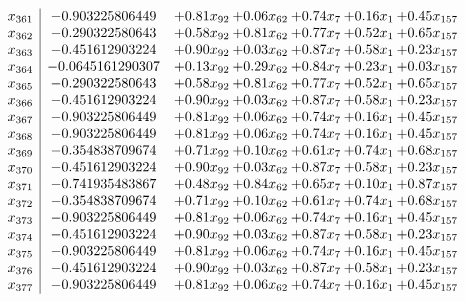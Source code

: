 \documentclass[8pt]{article}
\begin{document}
\[\begin{array}{c| c c@{\hskip 2pt} c@{\hskip 2pt} c@{\hskip 2pt} c@{\hskip 2pt} c@{\hskip 2pt} }
 x_{361}   &  -0.903225806449 & +  0.81 x_{92} & +  0.06 x_{62} & +  0.74 x_{7} & +  0.16 x_{1} & +  0.45 x_{157}\\
 x_{362}   &  -0.290322580643 & +  0.58 x_{92} & +  0.81 x_{62} & +  0.77 x_{7} & +  0.52 x_{1} & +  0.65 x_{157}\\
 x_{363}   &  -0.451612903224 & +  0.90 x_{92} & +  0.03 x_{62} & +  0.87 x_{7} & +  0.58 x_{1} & +  0.23 x_{157}\\
 x_{364}   &  -0.0645161290307 & +  0.13 x_{92} & +  0.29 x_{62} & +  0.84 x_{7} & +  0.23 x_{1} & +  0.03 x_{157}\\
 x_{365}   &  -0.290322580643 & +  0.58 x_{92} & +  0.81 x_{62} & +  0.77 x_{7} & +  0.52 x_{1} & +  0.65 x_{157}\\
 x_{366}   &  -0.451612903224 & +  0.90 x_{92} & +  0.03 x_{62} & +  0.87 x_{7} & +  0.58 x_{1} & +  0.23 x_{157}\\
 x_{367}   &  -0.903225806449 & +  0.81 x_{92} & +  0.06 x_{62} & +  0.74 x_{7} & +  0.16 x_{1} & +  0.45 x_{157}\\
 x_{368}   &  -0.903225806449 & +  0.81 x_{92} & +  0.06 x_{62} & +  0.74 x_{7} & +  0.16 x_{1} & +  0.45 x_{157}\\
 x_{369}   &  -0.354838709674 & +  0.71 x_{92} & +  0.10 x_{62} & +  0.61 x_{7} & +  0.74 x_{1} & +  0.68 x_{157}\\
 x_{370}   &  -0.451612903224 & +  0.90 x_{92} & +  0.03 x_{62} & +  0.87 x_{7} & +  0.58 x_{1} & +  0.23 x_{157}\\
 x_{371}   &  -0.741935483867 & +  0.48 x_{92} & +  0.84 x_{62} & +  0.65 x_{7} & +  0.10 x_{1} & +  0.87 x_{157}\\
 x_{372}   &  -0.354838709674 & +  0.71 x_{92} & +  0.10 x_{62} & +  0.61 x_{7} & +  0.74 x_{1} & +  0.68 x_{157}\\
 x_{373}   &  -0.903225806449 & +  0.81 x_{92} & +  0.06 x_{62} & +  0.74 x_{7} & +  0.16 x_{1} & +  0.45 x_{157}\\
 x_{374}   &  -0.451612903224 & +  0.90 x_{92} & +  0.03 x_{62} & +  0.87 x_{7} & +  0.58 x_{1} & +  0.23 x_{157}\\
 x_{375}   &  -0.903225806449 & +  0.81 x_{92} & +  0.06 x_{62} & +  0.74 x_{7} & +  0.16 x_{1} & +  0.45 x_{157}\\
 x_{376}   &  -0.451612903224 & +  0.90 x_{92} & +  0.03 x_{62} & +  0.87 x_{7} & +  0.58 x_{1} & +  0.23 x_{157}\\
 x_{377}   &  -0.903225806449 & +  0.81 x_{92} & +  0.06 x_{62} & +  0.74 x_{7} & +  0.16 x_{1} & +  0.45 x_{157}\\

\end{array}\]
\end{document}
